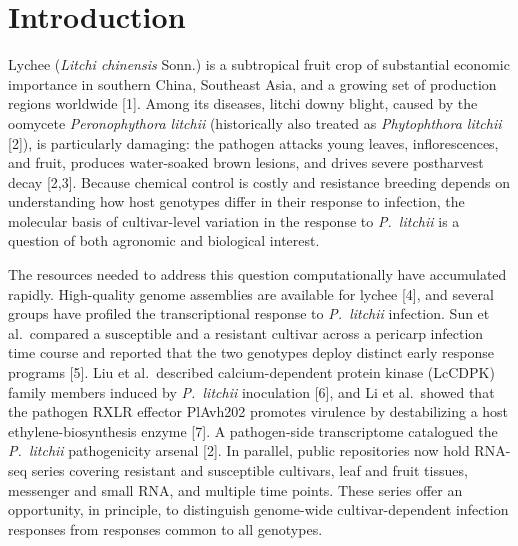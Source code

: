 \documentclass[11pt]{article}
\newcommand{\Pl}{\textit{P.~litchii}}
\begin{document}
\begin{abstract}
\vspace{0.6em}
\noindent\textbf{Keywords:} \textit{Litchi chinensis}; \textit{Peronophythora litchii}; downy blight; RNA-seq; cultivar-by-infection interaction; preregistered analysis; cross-context evaluation
\end{abstract}

\section{Introduction}

Lychee (\textit{Litchi chinensis} Sonn.) is a subtropical fruit crop of substantial economic importance in southern China, Southeast Asia, and a growing set of production regions worldwide [1]. Among its diseases, litchi downy blight, caused by the oomycete \textit{Peronophythora litchii} (historically also treated as \textit{Phytophthora litchii} [2]), is particularly damaging: the pathogen attacks young leaves, inflorescences, and fruit, produces water-soaked brown lesions, and drives severe postharvest decay [2,3]. Because chemical control is costly and resistance breeding depends on understanding how host genotypes differ in their response to infection, the molecular basis of cultivar-level variation in the response to \Pl{} is a question of both agronomic and biological interest.

The resources needed to address this question computationally have accumulated rapidly. High-quality genome assemblies are available for lychee [4], and several groups have profiled the transcriptional response to \Pl{} infection. Sun et al.\ compared a susceptible and a resistant cultivar across a pericarp infection time course and reported that the two genotypes deploy distinct early response programs [5]. Liu et al.\ described calcium-dependent protein kinase (LcCDPK) family members induced by \Pl{} inoculation [6], and Li et al.\ showed that the pathogen RXLR effector PlAvh202 promotes virulence by destabilizing a host ethylene-biosynthesis enzyme [7]. A pathogen-side transcriptome catalogued the \Pl{} pathogenicity arsenal [2]. In parallel, public repositories now hold RNA-seq series covering resistant and susceptible cultivars, leaf and fruit tissues, messenger and small RNA, and multiple time points. These series offer an opportunity, in principle, to distinguish genome-wide cultivar-dependent infection responses from responses common to all genotypes.
\end{document}
